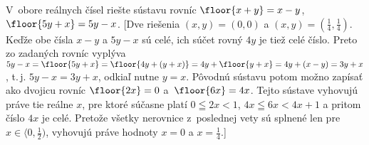 {V~obore reálnych čísel riešte sústavu rovníc $\floor{x+y} = x-y$,
$\floor{5y+x} = 5y-x$.
[Dve riešenia $(x,y)=(0,0)$ a $(x,y)=\left(\frac14,
\frac14\right)$. Keďže obe čísla $x-y$ a $5y-x$ sú celé,
ich súčet rovný $4y$ je tiež celé číslo. Preto zo zadaných
rovníc vyplýva $5y-x=\floor{5y+x}=\floor{4y+(y+x)}=4y+\floor{y+x}=
4y+(x-y)=3y+x$, t.\,j. $5y-x=3y+x$, odkiaľ nutne $y=x$. Pôvodnú sústavu
potom možno zapísať ako dvojicu rovníc $\floor{2x} = 0$ a~$\floor{6x}=4x$.
Tejto sústave vyhovujú práve tie reálne $x$, pre ktoré súčasne platí $0\leqq 2x<1$,
$4x\leqq 6x<4x+1$ a pritom číslo $4x$ je celé. Pretože všetky
nerovnice z~poslednej vety sú splnené len pre
$x\in\langle 0,\frac12)$, vyhovujú práve hodnoty $x=0$ a $x=\frac14$.]


}

